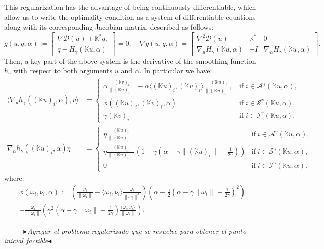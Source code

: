 \documentclass[review,onefignum,onetabnum]{siamonline190516}
\newcommand{\Dcal}{\mathcal{D}}
\newcommand{\scalar}[2]{\langle #1 , #2 \rangle}
\newcommand{\nb}[3]{
		{\colorbox{#2}{\bfseries\sffamily\scriptsize\textcolor{white}{#1}}}
		{\textcolor{#2}{\sf\small$\blacktriangleright$\textit{#3}$\blacktriangleleft$}}}
\newcommand{\dr}[1]{\nb{Dani}{white!30!blue}{#1}}
\begin{document}
This regularization has the advantage of being continuously differentiable, which allow us to write the optimality condition as a system of differentiable equations along with its corresponding Jacobian matrix, described as follows:
\begin{equation*}
    g(u,q,\alpha):=\begin{bmatrix}
      \nabla \Dcal(u) + \mathbb{K}^* q,\\
      q - H_\gamma(\mathbb{K}u,\alpha)
    \end{bmatrix}=0,\quad \nabla g(u,q,\alpha)=\begin{bmatrix}
      \nabla^2 \Dcal(u) & \mathbb{K}^* & 0 \\
      \nabla_u H_\gamma(\mathbb{K}u,\alpha) & -I & \nabla_\alpha H_\gamma(\mathbb{K}u,\alpha)
    \end{bmatrix}.
\end{equation*}
Then, a key part of the above system is the derivative of the smoothing function $h_\gamma$ with respect to both arguments $u$ and $\alpha$. In particular we have:
\begin{align*}
    \scalar{\nabla_u h_\gamma((\mathbb{K}u)_i,\alpha)}{v}&=\left\{\begin{array}{ll}
         \alpha \frac{(\mathbb{K}v)_i}{\|(\mathbb{K}u)_i\|}-\alpha \langle (\mathbb{K}u)_i,(\mathbb{K}v)_i\rangle\frac{(\mathbb{K}u)_i}{\|(\mathbb{K}u)_i\|^3}&\text{if}\;i\in\mathcal{A}^{\gamma}(\mathbb{K}u,\alpha),  \\
         \phi((\mathbb{K}u)_i,(\mathbb{K}v)_i,\alpha)&\text{if}\;i\in\mathcal{S}^{\gamma}(\mathbb{K}u,\alpha),\\
         \gamma(\mathbb{K}v)_i&\text{if}\;i\in\mathcal{I}^{\gamma}(\mathbb{K}u,\alpha).
    \end{array}\right.
    \\
    \nabla_\alpha h_\gamma((\mathbb{K}u)_i,\alpha)\eta&=\left\{\begin{array}{ll}
         \eta\frac{(\mathbb{K}u)_i}{\|(\mathbb{K}u)_i\|}&\text{if}\;i\in\mathcal{A}^{\gamma}(\mathbb{K}u,\alpha),  \\
         \eta\frac{(\mathbb{K}u)_i}{\|(\mathbb{K}u)_i\|}\left(1-\gamma\left(\alpha-\gamma\|(\mathbb{K}u)_i\|+\frac{1}{2\gamma}\right)\right)&\text{if}\;i\in\mathcal{S}^{\gamma}(\mathbb{K}u,\alpha),\\
         0&\text{if}\;i\in\mathcal{I}^{\gamma}(\mathbb{K}u,\alpha).
    \end{array}\right.
\end{align*}
where:
\begin{multline*}
  \phi(\omega_i,\nu_i,\alpha):= \left(\frac{\nu_i}{\|\omega_i\|}-\langle \omega_i,\nu_i\rangle\frac{\omega_i}{\|\omega_i\|^3}\right)\left(\alpha-\frac{\gamma}{2}\left(\alpha-\gamma\|\omega_i\|+\frac{1}{2\gamma}\right)^2\right) \\+ \frac{\omega_i}{\|\omega_i\|}\left(\gamma^2\left(\alpha-\gamma\|\omega_i\|+\frac{1}{2\gamma}\right)\frac{\langle \omega_i,\nu_i\rangle}{\|\omega_i\|}\right).
\end{multline*}
\dr{Agregar el problema regularizado que se resuelve para obtener el punto inicial factible}
\end{document}

